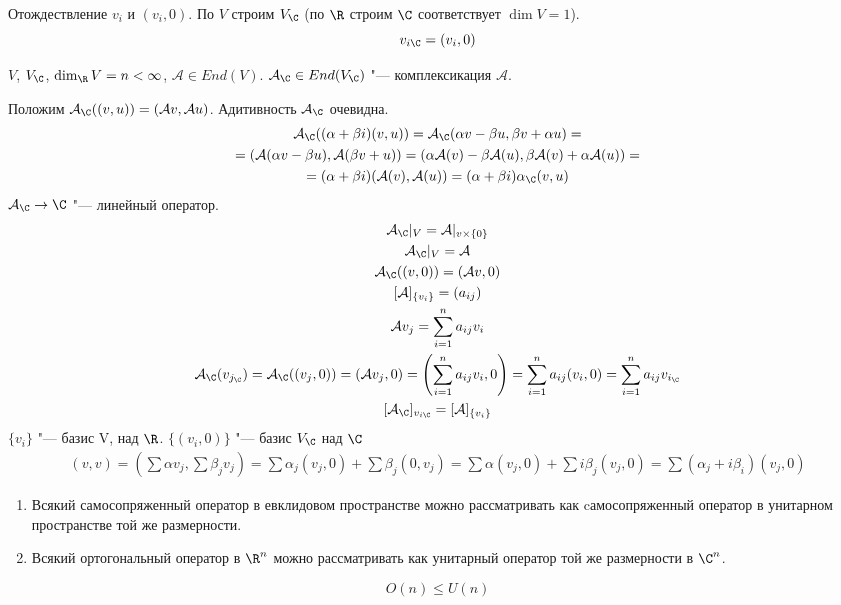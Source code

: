 Отождествление $v_i$ и $(v_i, 0)$.
По $V$ строим $V_{\C}$ (по $\R$ строим $\C$ соответствует $\dim V = 1$).
\[ v_{i\C} = (v_i,0) \]
\begin{Def}
	$V$, $V_{\C}$, $\dim_{\R}V = n < \infty$, $\mathcal A \in End(V)$.
	$\mathcal A_{\C} \in End(V_{\C})$ "--- комплексикация $\mathcal A$.
\end{Def}
Положим $\mathcal A_{\C} ((v, u)) = (\mathcal Av, \mathcal Au)$.
Адитивность $\mathcal A_{\C}$ очевидна.
\begin{gather*}
	\mathcal A_{\C}((\alpha + \beta i)(v, u))
	= \mathcal A_{\C}(\alpha v - \beta u, \beta v + \alpha u) = \\
	= (\mathcal A(\alpha v - \beta u), \mathcal A(\beta v + u))
	= (\alpha \mathcal A(v) - \beta \mathcal A(u), \beta \mathcal A(v) + \alpha \mathcal A(u)) = \\
	= (\alpha + \beta i)(\mathcal A(v), \mathcal A(u)) = (\alpha + \beta i)\alpha_{\C}(v, u)
\end{gather*}
$\mathcal A_{\C} \to \C$ "--- линейный оператор.
\begin{gather*}
	\mathcal A_{\C}|_{V} = \mathcal A|_{v \times \{0\}} \\
	\mathcal A_{\C}|_{V} = \mathcal A \\
	\mathcal A_{\C}((v, 0)) = (\mathcal Av, 0) \\
	[\mathcal A]_{\{v_i\}} = (a_{ij}) \\
	\mathcal A v_j = \sum_{i = 1}^n a_{ij}v_i \\
	\mathcal A_{\C}(v_{j_{\C}})
	= \mathcal A_{\C}((v_j, 0))
	= (\mathcal Av_j, 0)
	= \left(\sum_{i = 1}^{n}a_{ij}v_i, 0\right)
	= \sum_{i = 1}^{n}a_{ij}(v_i, 0)
	= \sum_{i = 1}^{n}a_{ij}v_{i_{\C}} \\
	[\mathcal A_{\C}]_{v_{i\C}} = [\mathcal A]_{\{v_i\}}
\end{gather*}
$\{v_i\}$ "--- базис V, над $\R$.
$\{(v_i, 0)\}$ "--- базис $V_{\C}$ над $\C$
\begin{gather*}
	(v, v)
	= \left(\sum \alpha v_j, \sum \beta_{j}v_j\right)
	= \sum \alpha_j(v_j, 0) + \sum \beta_j(0, v_j)
	= \sum \alpha(v_j, 0) + \sum i \beta_j(v_j, 0)
	= \sum(\alpha_j + i \beta_i)(v_j, 0)
\end{gather*}

\begin{exmp}\hfill
	\begin{enumerate}
	\item
		Всякий самосопряженный оператор в евклидовом пространстве можно рассматривать как
		cамосопряженный оператор в унитарном пространстве той же размерности.
	\item
		Всякий ортогональный оператор в $\R^n$ можно рассматривать как унитарный оператор той же размерности в $\C^n$.
	\end{enumerate}
\end{exmp}
\begin{conseq}
   \[ O(n) \le U(n) \]
\end{conseq}
